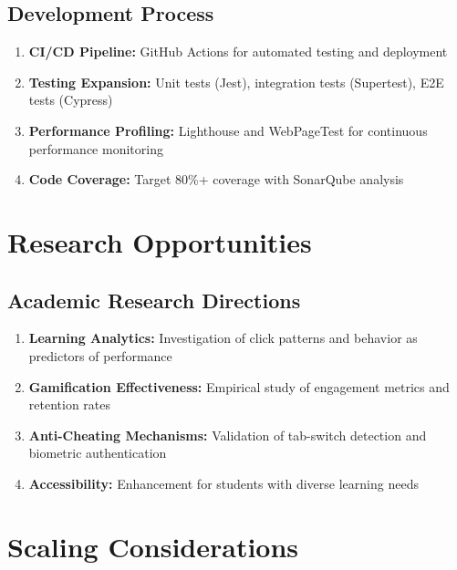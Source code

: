 \documentclass[12pt,a4paper]{report}
\begin{document}
\subsection{Development Process}

\begin{enumerate}[left=0pt]
  \item \textbf{CI/CD Pipeline:} GitHub Actions for automated testing and deployment
  
  \item \textbf{Testing Expansion:} Unit tests (Jest), integration tests (Supertest), E2E tests (Cypress)
  
  \item \textbf{Performance Profiling:} Lighthouse and WebPageTest for continuous performance monitoring
  
  \item \textbf{Code Coverage:} Target 80\%+ coverage with SonarQube analysis
\end{enumerate}

\section{Research Opportunities}

\subsection{Academic Research Directions}

\begin{enumerate}[left=0pt]
  \item \textbf{Learning Analytics:} Investigation of click patterns and behavior as predictors of performance
  
  \item \textbf{Gamification Effectiveness:} Empirical study of engagement metrics and retention rates
  
  \item \textbf{Anti-Cheating Mechanisms:} Validation of tab-switch detection and biometric authentication
  
  \item \textbf{Accessibility:} Enhancement for students with diverse learning needs
\end{enumerate}

\section{Scaling Considerations}
\end{document}
